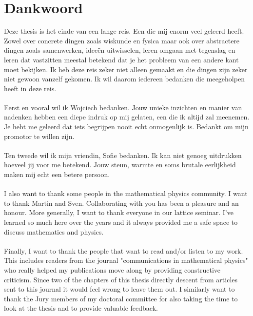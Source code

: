 \chapter*{Dankwoord}                                  \label{ch:preface}

Deze thesis is het einde van een lange reis. Een die mij enorm veel geleerd heeft. Zowel over concrete dingen zoals wiskunde en fysica maar ook over abstractere dingen zoals samenwerken, ideeën uitwisselen, leren omgaan met tegenslag en leren dat vastzitten meestal betekend dat je het probleem van een andere kant moet bekijken. Ik heb deze reis zeker niet alleen gemaakt  en die dingen zijn zeker niet gewoon vanzelf gekomen. Ik wil daarom iedereen bedanken die meegeholpen heeft in deze reis.
\\\\
Eerst en vooral wil ik Wojciech bedanken. Jouw unieke inzichten en manier van nadenken hebben een diepe indruk op mij gelaten, een die ik altijd zal meenemen. Je hebt me geleerd dat iets begrijpen nooit echt onmogenlijk is. Bedankt om mijn promotor te willen zijn.
\\\\
Ten tweede wil ik mijn vriendin, Sofie bedanken. Ik kan niet genoeg uitdrukken hoeveel jij voor me betekend. Jouw steun, warmte en soms brutale eerlijkheid maken mij echt een betere persoon.
\\\\
I also want to thank some people in the mathematical physics community. I want to thank Martin and Sven. Collaborating with you has been a pleasure and an honour. More generally, I want to thank everyone in our lattice seminar. I've learned so much here over the years and it always provided me a safe space to discuss mathematics and physics.
\\\\
Finally, I want to thank the people that want to read and/or listen to my work. This includes readers from the journal "communications in mathematical physics" who really helped my publications move along by providing constructive criticism. Since two of the chapters of this thesis directly descent from articles sent to this journal it would feel wrong to leave them out. I similarly want to thank the Jury members of my doctoral committee for also taking the time to look at the thesis and to provide valuable feedback.

\instructionspreface


\cleardoublepage

